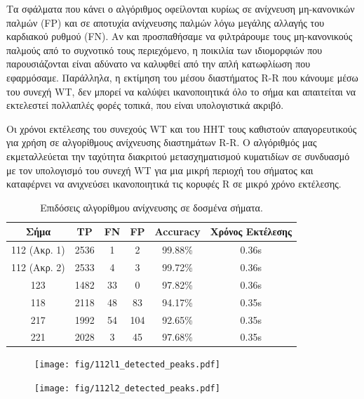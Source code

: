\documentclass[11pt,a4paper]{article}
\begin{document}
Τα σφάλματα που κάνει ο αλγόριθμος οφείλονται κυρίως σε ανίχνευση μη-κανονικών παλμών (FP) και σε αποτυχία ανίχνευσης παλμών λόγω μεγάλης αλλαγής του καρδιακού ρυθμού (FN). Αν και προσπαθήσαμε να φιλτράρουμε τους μη-κανονικούς παλμούς από το συχνοτικό τους περιεχόμενο, η ποικιλία των ιδιομορφιών που παρουσιάζονται είναι αδύνατο να καλυφθεί από την απλή κατωφλίωση που εφαρμόσαμε. Παράλληλα, η εκτίμηση του μέσου διαστήματος R-R που κάνουμε μέσω του συνεχή WT, δεν μπορεί να καλύψει ικανοποιητικά όλο το σήμα και απαιτείται να εκτελεστεί πολλαπλές φορές τοπικά, που είναι υπολογιστικά ακριβό.

Οι χρόνοι εκτέλεσης του συνεχούς WT και του HHT τους καθιστούν απαγορευτικούς για χρήση σε αλγορίθμους ανίχνευσης διαστημάτων R-R. Ο αλγόριθμός μας εκμεταλλεύεται την ταχύτητα διακριτού μετασχηματισμού κυματιδίων σε συνδυασμό με τον υπολογισμό του συνεχή WT για μια μικρή περιοχή του σήματος και καταφέρνει να ανιχνεύσει ικανοποιητικά τις κορυφές R σε μικρό χρόνο εκτέλεσης.


\begin{table}[H]
\begin{center}
\begin{tabular}{| c | c | c | c | c | c |}
 \hline
 Σήμα & TP & FN & FP & Accuracy & Χρόνος Εκτέλεσης \\ 
 \hline
 112 (Ακρ. 1) & 2536 & 1 & 2 & 99.88\% & 0.36s \\ 
 \hline
 112 (Ακρ. 2) & 2533 & 4 & 3 & 99.72\% & 0.36s \\ 
 \hline
 123 & 1482 & 33 & 0 & 97.82\% & 0.36s \\ 
 \hline
 118 & 2118 & 48 & 83 & 94.17\% & 0.35s \\ 
 \hline
 217 & 1992 & 54 & 104 & 92.65\% & 0.35s \\ 
 \hline
 221 & 2028 & 3 & 45 & 97.68\% & 0.35s \\ 
 \hline
\end{tabular}
\end{center}



\caption{Επιδόσεις αλγορίθμου ανίχνευσης σε δοσμένα σήματα.}
\label{tab:accuracy}
\end{table}


\begin{figure}[H]
\centering
\begin{minipage}{0.48\textwidth}
	\centering
	\texttt{[image: fig/112l1\_detected\_peaks.pdf]}
\end{minipage}
\begin{minipage}{0.48\textwidth}
	\centering
	\texttt{[image: fig/112l2\_detected\_peaks.pdf]}
\end{minipage}
\end{figure}
\end{document}
